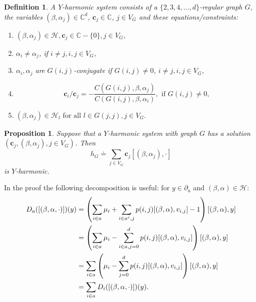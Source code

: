 \documentclass[11pt,a4paper]{article}
\newtheorem{definition}{Definition}[section]
\newtheorem{proposition}{Proposition}[section]
\begin{document}
\begin{definition}\label{d:Yharmonic} A $Y$-harmonic system consists
of a $\{2,3,4,...,d\}$-regular graph $G$,
the variables
$ (\beta,\alpha_j)  \in {\mathbb C}^d$, ${\boldsymbol c}_j \in {\mathbb C}$,  $j \in V_G$
and these equations/constraints:
\begin{enumerate}
\item
$(\beta,\alpha_j) \in {\mathcal H}, {\boldsymbol c}_j \in {\mathbb C}-\{0\}, j \in V_G$, 
\item
$\alpha_{i} \neq \alpha_{j}$,  if $i \neq j, i,j  \in V_G$,
\item
$\alpha_{i}, \alpha_{j}$  are $G(i,j)$-conjugate if  
$ G(i,j) \neq 0$, $i \neq j, i,j \in V_G$,
\item 
\begin{equation}
\label{e:correctmultipliers}
{\boldsymbol c}_{i}/{\boldsymbol c}_{j} = 
-\frac{C(G(i,j),\beta,\alpha_j)}{C(G(i,j),\beta,\alpha_i)}, \text{ if } G(i,j) \neq 0,
\end{equation}
\item
$(\beta,\alpha_j) \in {\mathcal H}_l \text{ for all } l \in G(j,j), j \in V_G.$
\end{enumerate}
\end{definition}

\begin{proposition}\label{p:simpleharmonicfunctions}
Suppose that 
a $Y$-harmonic system with graph $G$
has a solution $({\boldsymbol c}_j, (\beta,\alpha_j), j \in V_G)$.
Then
\begin{equation}\label{e:defhG}
h_G \doteq \sum_{j \in V_G} {\boldsymbol c}_j [(\beta,\alpha_j),\cdot]
\end{equation}
is $Y$-harmonic.
\end{proposition}
In the proof the following decomposition is useful:
for $y \in \partial_a$ and $(\beta,\alpha) \in {\mathcal H}$:
\begin{align}%
D_a( [(\beta,\alpha,\cdot)])(y) &=
\left( \sum_{i \in a} \mu_i
+\sum_{i \in a^c, j} p(i,j) [ (\beta,\alpha),v_{i,j} ]  -1\right) 
[ (\beta,\alpha), y]\notag \\
&=
\left( \sum_{i \in a} \mu_i
-\sum_{i \in a, j=0}^d p(i,j) [ (\beta,\alpha),v_{i,j} ] \right) 
[ (\beta,\alpha), y]\notag \\
&=
\sum_{i \in a} \left(
\mu_i - \sum_{ j=0}^d p(i,j) [ (\beta,\alpha),v_{i,j} ] \right) 
[ (\beta,\alpha), y]\notag \\
&= \sum_{i \in a} D_i( [(\beta,\alpha,\cdot)])(y) \label{e:Dadecomposed}.
\end{align}
\end{document}
